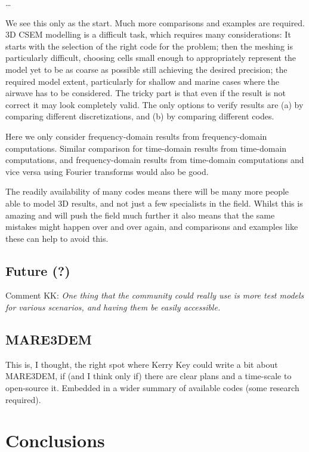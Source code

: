 \documentclass[
    paper,
  ]{geophysics}
\begin{document}
\dots

We see this only as the start. Much more comparisons and examples are required.
3D CSEM modelling is a difficult task, which requires many considerations: It
starts with the selection of the right code for the problem; then the meshing
is particularly difficult, choosing cells small enough to appropriately
represent the model yet to be as coarse as possible still achieving the desired
precision; the required model extent, particularly for shallow and marine cases
where the airwave has to be considered. The tricky part is that even if the
result is not correct it may look completely valid. The only options to verify
results are (a) by comparing different discretizations, and (b) by comparing
different codes.

Here we only consider frequency-domain results from frequency-domain
computations. Similar comparison for time-domain results from time-domain
computations, and frequency-domain results from time-domain computations and
vice versa using Fourier transforms would also be good.

The readily availability of many codes means there will be many more people
able to model 3D results, and not just a few specialists in the field. Whilst
this is amazing and will push the field much further it also means that the
same mistakes might happen over and over again, and comparisons and examples
like these can help to avoid this.

\subsection{Future (?)}

Comment KK: \emph{One thing that the community could really use is more test
models for various scenarios, and having them be easily accessible.}


\subsection{MARE3DEM}

This is, I thought, the right spot where Kerry Key could write a bit about
MARE3DEM, if (and I think only if) there are clear plans and a time-scale to
open-source it. Embedded in a wider summary of available codes (some research
required).

\section{Conclusions}
\end{document}

